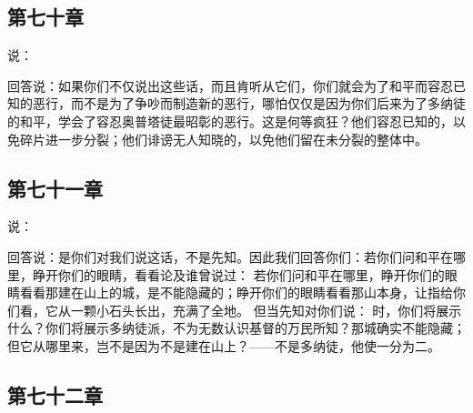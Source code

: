 
\subsection{第七十章}

 说：\par

 回答说：如果你们不仅说出这些话，而且肯听从它们，你们就会为了和平而容忍已知的恶行，而不是为了争吵而制造新的恶行，哪怕仅仅是因为你们后来为了多纳徒的和平，学会了容忍奥普塔徒最昭彰的恶行。这是何等疯狂？他们容忍已知的，以免碎片进一步分裂；他们诽谤无人知晓的，以免他们留在未分裂的整体中。\par


\subsection{第七十一章}

 说：\par

 回答说：是你们对我们说这话，不是先知。因此我们回答你们：若你们问和平在哪里，睁开你们的眼睛，看看论及谁曾说过： 若你们问和平在哪里，睁开你们的眼睛看看那建在山上的城，是不能隐藏的；睁开你们的眼睛看看那山本身，让指给你们看，它从一颗小石头长出，充满了全地。 但当先知对你们说： 时，你们将展示什么？你们将展示多纳徒派，不为无数认识基督的万民所知？那城确实不能隐藏；但它从哪里来，岂不是因为不是建在山上？——不是多纳徒，他使一分为二。\par


\subsection{第七十二章}

